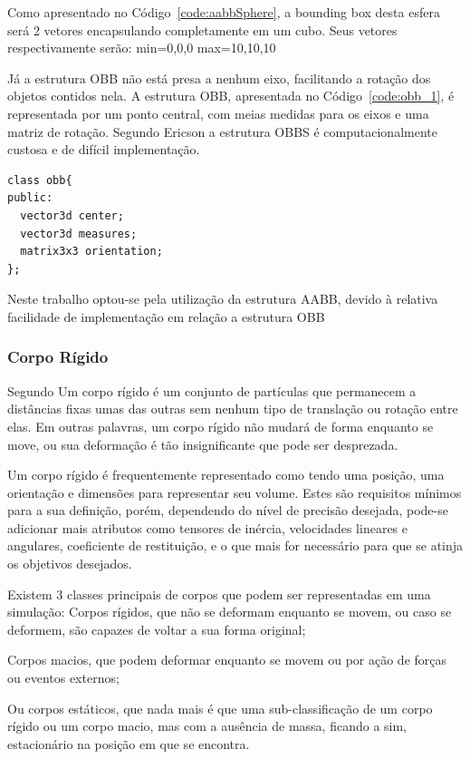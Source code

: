 Como apresentado no Código~\ref{code:aabbSphere}, a bounding box desta esfera será 2 vetores encapsulando completamente em um cubo. Seus vetores respectivamente serão: min=0,0,0 max=10,10,10

Já a estrutura OBB não está presa a nenhum eixo, facilitando a rotação dos objetos contidos nela. A estrutura OBB, apresentada no Código~\ref{code:obb_1},  é representada por um ponto central, com meias medidas para os eixos e uma matriz de rotação. Segundo Ericson a estrutura OBBS é computacionalmente custosa e de difícil implementação.

\begin{lstlisting}[frame=single,caption=Código de exemplo de OBB\label{code:obb_1}]
class obb{
public:
  vector3d center;
  vector3d measures;
  matrix3x3 orientation;
};
\end{lstlisting}

Neste trabalho optou-se pela utilização da estrutura AABB, devido à relativa facilidade de implementação em relação a estrutura OBB

\subsubsection{Corpo Rígido}
Segundo  Um corpo rígido é um conjunto de partículas  que permanecem a distâncias fixas umas das outras  sem nenhum tipo de translação ou rotação entre elas. Em outras palavras,  um corpo rígido não mudará de forma enquanto se move, ou sua deformação é tão insignificante que pode ser desprezada.

Um corpo rígido é  frequentemente representado como tendo uma posição, uma orientação  e  dimensões para representar seu volume. Estes são requisitos mínimos para a  sua definição, porém, dependendo do nível de precisão desejada, pode-se adicionar mais atributos como tensores de inércia, velocidades lineares e angulares, coeficiente de restituição, e o que mais for necessário para que se atinja os objetivos desejados.

Existem 3 classes principais de corpos que podem ser representadas em uma simulação:
Corpos rígidos, que não se deformam  enquanto se movem, ou caso se deformem, são capazes de voltar a sua forma original;


Corpos macios, que podem deformar enquanto se movem ou por ação de forças ou eventos externos;

Ou corpos estáticos, que nada mais é que uma sub-classificação de um corpo rígido ou um corpo macio,  mas com a ausência de massa, ficando a sim, estacionário na posição em que se
encontra.


